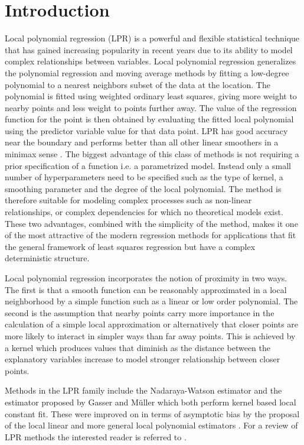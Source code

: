\documentclass[preprint,1p,times]{elsarticle}
\begin{document}
\section{Introduction}
\label{s:Introduction}
Local polynomial regression (LPR) is a powerful and flexible statistical technique that has gained increasing popularity in recent years due to its ability to model complex relationships between variables. Local polynomial regression generalizes the polynomial regression and moving average methods by fitting a low-degree polynomial to a nearest neighbors subset of the data at the location. The polynomial is fitted using weighted ordinary least squares, giving more weight to nearby points and less weight to points further away. The value of the regression function for the point is then obtained by evaluating the fitted local polynomial using the predictor variable value for that data point. LPR has good accuracy near the boundary and performs better than all other linear smoothers in a minimax sense \citep{Avery2010LiteratureRF}. The biggest advantage of this class of methods is not requiring a prior specification of a function i.e. a parametrized model. Instead only a small number of hyperparameters need to be specified such as the type of kernel, a smoothing parameter and the degree of the local polynomial. The method is therefore suitable for modeling complex processes such as non-linear relationships, or complex dependencies for which no theoretical models exist. These two advantages, combined with the simplicity of the method, makes it one of the most attractive of the modern regression methods for applications that fit the general framework of least squares regression but have a complex deterministic structure. 

Local polynomial regression incorporates the notion of proximity in two ways. The first is that a smooth function can be reasonably approximated in a local neighborhood by a simple function such as a linear or low order polynomial. The second is the assumption that nearby points carry more importance in the calculation of a simple local approximation or alternatively that closer points are more likely to interact in simpler ways than far away points. This is achieved by a kernel which produces values that diminish as the distance between the explanatory variables increase to model stronger relationship between closer points. 

Methods in the LPR family include the Nadaraya-Watson estimator \citep{Nadaraya1964OnER, Watson1964SmoothRA} and the estimator proposed by Gasser and M{\"u}ller \citep{Gasser1984EstimatingRF} which both perform kernel based local constant fit. These were improved on in terms
of asymptotic bias by the proposal of the local linear and more general local polynomial estimators \citep{Stone1977ConsistentNR, clevland79, 85a168c3-c6d4-3039-8afe-b1944919c518, clevland_devlin88, fan_1993}. For a review of LPR methods the interested reader is referred to \citep{Avery2010LiteratureRF}.
\end{document}
